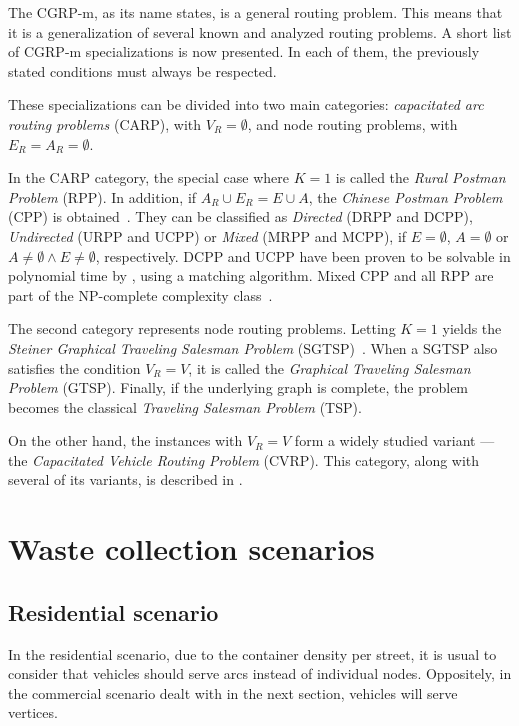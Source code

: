 The CGRP-m, as its name states, is a general routing problem. This means that
it is a generalization of several known and analyzed routing problems. A short
list of CGRP-m specializations is now presented. In each of them, the
previously stated conditions must always be respected.

These specializations can be divided into two main categories:
\textit{capacitated arc routing problems} (CARP), with $V_R = \emptyset$, and
node routing problems, with $E_R = A_R = \emptyset$.

In the CARP category, the special case where $K = 1$ is called the
\textit{Rural Postman Problem} (RPP). In addition, if $A_R \cup E_R = E \cup
A$, the \textit{Chinese Postman Problem} (CPP) is obtained~\citep{Pandit95}.
They can be classified as \textit{Directed} (DRPP and DCPP),
\textit{Undirected} (URPP and UCPP) or \textit{Mixed} (MRPP and MCPP), if $E =
\emptyset$, $A = \emptyset$ or $A \neq \emptyset \wedge E \neq \emptyset$,
respectively. DCPP and UCPP have been proven to be solvable in polynomial time
by \citet{Edmonds73}, using a matching algorithm. Mixed CPP and all RPP are
part of the NP-complete complexity class~\citep{Pandit95}.

The second category represents node routing problems. Letting $K = 1$ yields
the \textit{Steiner Graphical Traveling Salesman Problem}
(SGTSP)~\citep{Letchford99}. When a SGTSP also satisfies the condition $V_R =
V$, it is called the \textit{Graphical Traveling Salesman Problem} (GTSP).
Finally, if the underlying graph is complete, the problem becomes the classical
\textit{Traveling Salesman Problem} (TSP).

On the other hand, the instances with $V_R = V$ form a widely studied variant
--- the \textit{Capacitated Vehicle Routing Problem} (CVRP). This category,
along with several of its variants, is described in \citet{Toth01book}.


\section{Waste collection scenarios}
\label{section:waste-collection-scenarios}




\subsection{Residential scenario}
\label{section:residential}

In the residential scenario, due to the container density per street, it is
usual to consider that vehicles should serve arcs instead of individual nodes.
Oppositely, in the commercial scenario dealt with in the next section, vehicles
will serve vertices.



